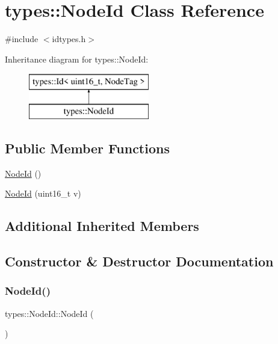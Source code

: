 \hypertarget{classtypes_1_1_node_id}{}\section{types\+::Node\+Id Class Reference}
\label{classtypes_1_1_node_id}


{\ttfamily \#include $<$idtypes.\+h$>$}

Inheritance diagram for types\+::Node\+Id\+:\begin{figure}[H]
\begin{center}
\leavevmode
\includegraphics[height=2.000000cm]{d2/d5e/classtypes_1_1_node_id}
\end{center}
\end{figure}
\subsection*{Public Member Functions}
\begin{DoxyCompactItemize}
\item 
\mbox{\hyperlink{classtypes_1_1_node_id_af41c8049e83d9b2a301cfcc9c1a1e7e0}{Node\+Id}} ()
\item 
\mbox{\hyperlink{classtypes_1_1_node_id_a66d4868f5e05b2a8e58aea724e9bcaa7}{Node\+Id}} (uint16\+\_\+t v)
\end{DoxyCompactItemize}
\subsection*{Additional Inherited Members}


\subsection{Constructor \& Destructor Documentation}
\mbox{\label{classtypes_1_1_node_id_af41c8049e83d9b2a301cfcc9c1a1e7e0}} 
\subsubsection{\texorpdfstring{NodeId()}{NodeId()}\hspace{0.1cm}{\footnotesize\ttfamily [1/2]}}
{\footnotesize\ttfamily types\+::\+Node\+Id\+::\+Node\+Id (\begin{DoxyParamCaption}{ }\end{DoxyParamCaption})\hspace{0.3cm}{\ttfamily [inline]}}

